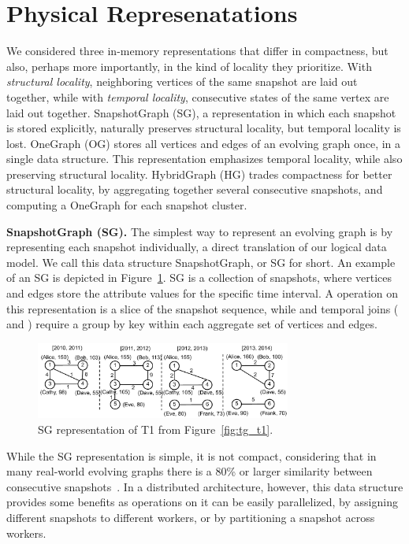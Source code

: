 \section{Physical Represenatations}
\label{sec:physical}

We considered three in-memory \tg representations that differ in
compactness, but also, perhaps more importantly, in the kind of
locality they prioritize. With {\em structural locality}, neighboring
vertices of the same snapshot are laid out together, while with {\em
  temporal locality}, consecutive states of the same vertex are laid
out together.  SnapshotGraph (SG), a representation in which each
snapshot is stored explicitly, naturally preserves structural
locality, but temporal locality is lost. OneGraph (OG) stores all
vertices and edges of an evolving graph once, in a single data
structure.  This representation emphasizes temporal locality, while
also preserving structural locality.  HybridGraph (HG) trades
compactness for better structural locality, by aggregating together
several consecutive snapshots, and computing a OneGraph for each
snapshot cluster.

{\bf SnapshotGraph (SG).} The simplest way to represent an evolving
graph is by representing each snapshot individually, a direct
translation of our logical data model.  We call this data structure
SnapshotGraph, or SG for short. An example of an SG is depicted in
Figure~\ref{fig:sgp}.  SG is a collection of snapshots, where vertices
and edges store the attribute values for the specific time interval.
A  operation on this representation is a slice of the
snapshot sequence, while  and temporal joins
( and ) require a group by key within each
aggregate set of vertices and edges.

\begin{figure}[t!]
\includegraphics[width=3.3in]{figs/sgp.pdf}
\caption{SG representation of T1 from Figure~\ref{fig:tg_t1}.}
\label{fig:sgp}
\vspace{-0.3cm}
\end{figure}

While the SG representation is simple, it is not compact, considering
that in many real-world evolving graphs there is a 80\% or larger
similarity between consecutive
snapshots~\cite{DBLP:journals/tos/MiaoHLWYZPCC15}.  In a distributed
architecture, however, this data structure provides some benefits as
operations on it can be easily parallelized, by assigning different
snapshots to different workers, or by partitioning a snapshot across
workers.  

